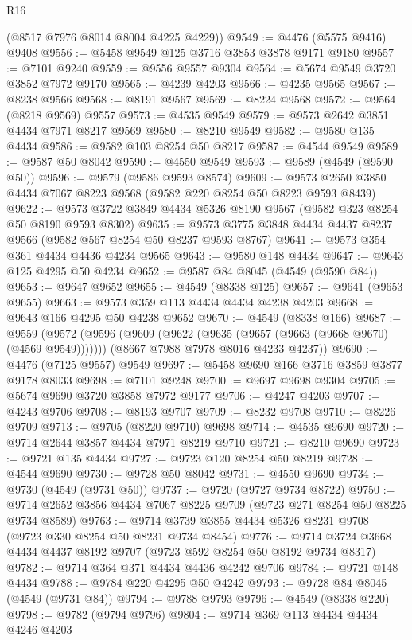 \begin{lexlean}{R16}
\begin{coremodule}
      (@8517 @7976 @8014 @8004 @4225 @4229))
@9549 := @4476 (@5575 @9416) @9408
@9556 := @5458 @9549 @125 @3716 @3853 @3878 @9171 @9180
@9557 := @7101 @9240
@9559 := @9556 @9557 @9304
@9564 := @5674 @9549 @3720 @3852 @7972 @9170
@9565 := @4239 @4203
@9566 := @4235 @9565
@9567 := @8238 @9566
@9568 := @8191 @9567
@9569 := @8224 @9568
@9572 := @9564 (@8218 @9569) @9557
@9573 := @4535 @9549
@9579 := @9573 @2642 @3851 @4434 @7971 @8217 @9569
@9580 := @8210 @9549
@9582 := @9580 @135 @4434
@9586 := @9582 @103 @8254 @50 @8217
@9587 := @4544 @9549
@9589 := @9587 @50 @8042
@9590 := @4550 @9549
@9593 := @9589 (@4549 (@9590 @50))
@9596 := @9579 (@9586 @9593 @8574)
@9609 := @9573 @2650 @3850 @4434 @7067 @8223 @9568 (@9582 @220 @8254 @50 @8223 @9593 @8439)
@9622 := @9573 @3722 @3849 @4434 @5326 @8190 @9567 (@9582 @323 @8254 @50 @8190 @9593 @8302)
@9635 := @9573 @3775 @3848 @4434 @4437 @8237 @9566 (@9582 @567 @8254 @50 @8237 @9593 @8767)
@9641 := @9573 @354 @361 @4434 @4436 @4234 @9565
@9643 := @9580 @148 @4434
@9647 := @9643 @125 @4295 @50 @4234
@9652 := @9587 @84 @8045 (@4549 (@9590 @84))
@9653 := @9647 @9652
@9655 := @4549 (@8338 @125)
@9657 := @9641 (@9653 @9655)
@9663 := @9573 @359 @113 @4434 @4434 @4238 @4203
@9668 := @9643 @166 @4295 @50 @4238 @9652
@9670 := @4549 (@8338 @166)
@9687 := @9559
    (@9572
      (@9596 (@9609 (@9622 (@9635 (@9657 (@9663 (@9668 @9670) (@4569 @9549)))))))
      (@8667 @7988 @7978 @8016 @4233 @4237))
@9690 := @4476 (@7125 @9557) @9549
@9697 := @5458 @9690 @166 @3716 @3859 @3877 @9178 @8033
@9698 := @7101 @9248
@9700 := @9697 @9698 @9304
@9705 := @5674 @9690 @3720 @3858 @7972 @9177
@9706 := @4247 @4203
@9707 := @4243 @9706
@9708 := @8193 @9707
@9709 := @8232 @9708
@9710 := @8226 @9709
@9713 := @9705 (@8220 @9710) @9698
@9714 := @4535 @9690
@9720 := @9714 @2644 @3857 @4434 @7971 @8219 @9710
@9721 := @8210 @9690
@9723 := @9721 @135 @4434
@9727 := @9723 @120 @8254 @50 @8219
@9728 := @4544 @9690
@9730 := @9728 @50 @8042
@9731 := @4550 @9690
@9734 := @9730 (@4549 (@9731 @50))
@9737 := @9720 (@9727 @9734 @8722)
@9750 := @9714 @2652 @3856 @4434 @7067 @8225 @9709 (@9723 @271 @8254 @50 @8225 @9734 @8589)
@9763 := @9714 @3739 @3855 @4434 @5326 @8231 @9708 (@9723 @330 @8254 @50 @8231 @9734 @8454)
@9776 := @9714 @3724 @3668 @4434 @4437 @8192 @9707 (@9723 @592 @8254 @50 @8192 @9734 @8317)
@9782 := @9714 @364 @371 @4434 @4436 @4242 @9706
@9784 := @9721 @148 @4434
@9788 := @9784 @220 @4295 @50 @4242
@9793 := @9728 @84 @8045 (@4549 (@9731 @84))
@9794 := @9788 @9793
@9796 := @4549 (@8338 @220)
@9798 := @9782 (@9794 @9796)
@9804 := @9714 @369 @113 @4434 @4434 @4246 @4203

\end{coremodule}
\end{lexlean}
